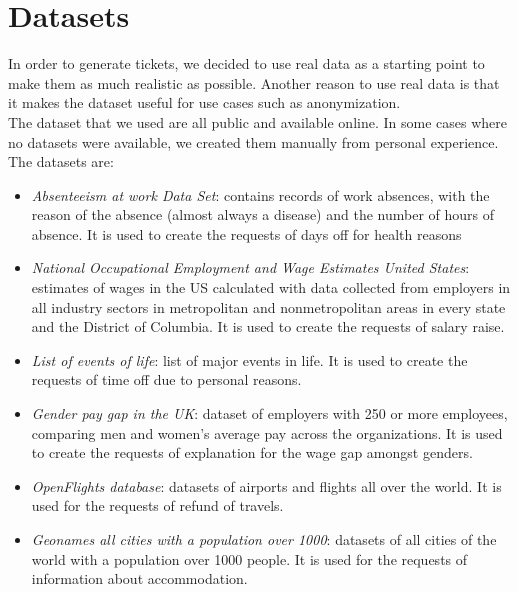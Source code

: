 \section{Datasets}
In order to generate tickets, we decided to use real data as a starting point to make them as much realistic as possible. Another reason to use real data is that it makes the dataset useful for use cases such as anonymization. \\
The dataset that we used are all public and available online. In some cases where no datasets were available, we created them manually from personal experience. \\
The datasets are:
\begin{itemize}
    \item \textit{Absenteeism at work Data Set}: contains records of work absences, with the reason of the absence (almost always a disease) and the number of hours of absence. It is used to create the requests of days off for health reasons
    \item \textit{National Occupational Employment and Wage Estimates United States}: estimates of wages in the US calculated with data collected from employers in all industry sectors in metropolitan and nonmetropolitan areas in every state and the District of Columbia. It is used to create the requests of salary raise.
    \item \textit{List of events of life}: list of major events in life. It is used to create the requests of time off due to personal reasons. 
    \item \textit{Gender pay gap in the UK}: dataset of employers with 250 or more employees, comparing men and women’s average pay across the organizations. It is used to create the requests of explanation for the wage gap amongst genders.
    \item \textit{OpenFlights database}: datasets of airports and flights all over the world. It is used for the requests of refund of travels.
    \item \textit{Geonames all cities with a population over 1000}: datasets of all cities of the world with a population over 1000 people. It is used for the requests of information about accommodation.
\end{itemize}

